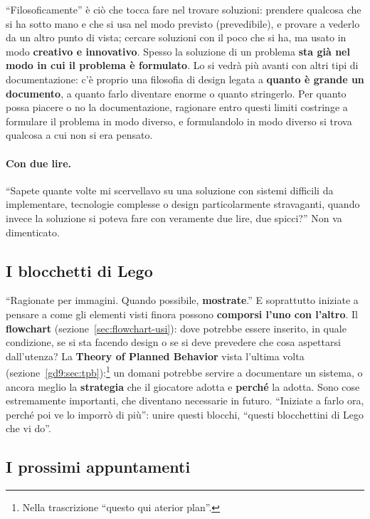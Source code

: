 ``Filosoficamente'' è ciò che tocca fare nel trovare soluzioni: prendere
qualcosa che si ha sotto mano e che si usa nel modo previsto (prevedibile),
e provare a vederlo da un altro punto di vista; cercare soluzioni con il poco
che si ha, ma usato in modo \textbf{creativo e innovativo}. Spesso la
soluzione di un problema \textbf{sta già nel modo in cui il problema è
formulato}. Lo si vedrà più avanti con altri tipi di documentazione: c'è
proprio una filosofia di design legata a \textbf{quanto è grande un
documento}, a quanto farlo diventare enorme o quanto stringerlo. Per quanto
possa piacere o no la documentazione, ragionare entro questi limiti
costringe a formulare il problema in modo diverso, e formulandolo in modo
diverso si trova qualcosa a cui non si era pensato.

\paragraph{Con due lire.} ``Sapete quante volte mi scervellavo su una
soluzione con sistemi difficili da implementare, tecnologie complesse o
design particolarmente stravaganti, quando invece la soluzione si poteva
fare con veramente due lire, due spicci?'' Non va dimenticato.

\subsection{I blocchetti di Lego}

``Ragionate per immagini. Quando possibile, \textbf{mostrate}.'' E
soprattutto iniziate a pensare a come gli elementi visti finora possono
\textbf{comporsi l'uno con l'altro}. Il \textbf{flowchart}
(sezione~\ref{sec:flowchart-usi}): dove potrebbe essere inserito, in quale
condizione, se si sta facendo design o se si deve prevedere che cosa
aspettarsi dall'utenza? La \textbf{Theory of Planned Behavior} vista
l'ultima volta (sezione~\ref{gd9:sec:tpb}):\footnote{Nella trascrizione
``questo qui aterior plan''.} un domani potrebbe servire a documentare un
sistema, o ancora meglio la \textbf{strategia} che il giocatore adotta e
\textbf{perché} la adotta. Sono cose estremamente importanti, che diventano
necessarie in futuro. ``Iniziate a farlo ora, perché poi ve lo imporrò di
più'': unire questi blocchi, ``questi blocchettini di Lego che vi do''.

\subsection{I prossimi appuntamenti}

